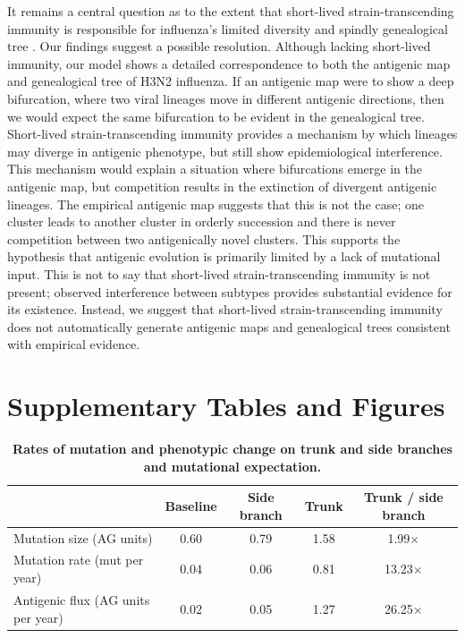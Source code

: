 It remains a central question as to the extent that short-lived strain-transcending immunity is responsible for influenza's limited diversity and spindly genealogical tree \cite{Ferguson03,Tria05}.  Our findings suggest a possible resolution.  Although lacking short-lived immunity, our model shows a detailed correspondence to both the antigenic map and genealogical tree of H3N2 influenza.  If an antigenic map were to show a deep bifurcation, where two viral lineages move in different antigenic directions, then we would expect the same bifurcation to be evident in the genealogical tree.  Short-lived strain-transcending immunity provides a mechanism by which lineages may diverge in antigenic phenotype, but still show epidemiological interference.  This mechanism would explain a situation where bifurcations emerge in the antigenic map, but competition results in the extinction of divergent antigenic lineages.  The empirical antigenic map \cite{Smith04} suggests that this is not the case; one cluster leads to another cluster in orderly succession and there is never competition between two antigenically novel clusters.  This supports the hypothesis that antigenic evolution is primarily limited by a lack of mutational input.  This is not to say that short-lived strain-transcending immunity is not present; observed interference between subtypes \cite{Ferguson03,Goldstein11} provides substantial evidence for its existence.  Instead, we suggest that short-lived strain-transcending immunity does not automatically generate antigenic maps and genealogical trees consistent with empirical evidence.




\vspace{1cm}

\section*{Supplementary Tables and Figures}

\begin{table}[h]
	\centering
	\caption{\textbf{Rates of mutation and phenotypic change on trunk and side branches and mutational expectation.}}
	\label{mktable}
	\begin{tabular}{ l c c c c } 
	\hline
		 								& Baseline 	& Side branch 	& Trunk		& Trunk / side branch \\
	\hline				
	Mutation size (AG units)			& 0.60		& 0.79			& 1.58		& 1.99$\times$ \\
	Mutation rate (mut per year)		& 0.04		& 0.06			& 0.81		& 13.23$\times$ \\	
	Antigenic flux (AG units per year)	& 0.02		& 0.05			& 1.27		& 26.25$\times$ \\		
	\hline
	\end{tabular}
\end{table}

